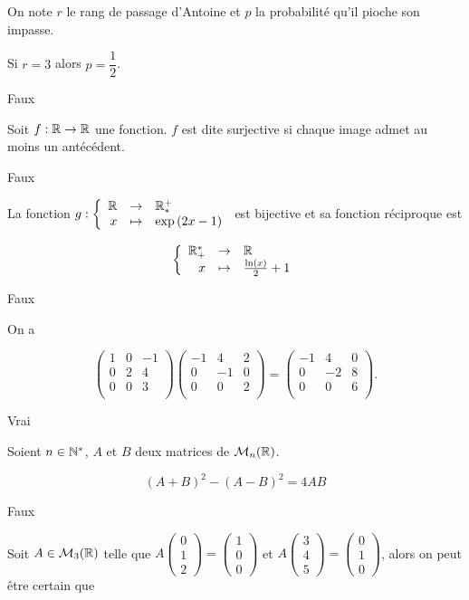 \documentclass{article}
\begin{document}
On note $r$ le rang de passage d'Antoine et $p$ la probabilité qu'il pioche son impasse.


Si $r=3$ alors $p = \dfrac{1}{2}$.

\reponse Faux

\question Soit $f : \mathbb{R} \to \mathbb{R}$ une fonction. $f$ est dite surjective si chaque image admet au moins un antécédent.  

\reponse Faux

\question La fonction $g : \left\{ \begin{array}{rcl}
\mathbb{R}  & \to & \mathbb{R}^+_* \\
x   & \mapsto & \exp\left( 2x-1 \right)
\end{array} \right.$ est bijective et sa fonction réciproque est 

$$ \left\{ \begin{array}{rcl}
\mathbb{R}^*_+  & \to & \mathbb{R} \\
x   & \mapsto &  \frac{\ln(x)}{2}  +1 
\end{array} \right.
$$


\reponse Faux

\question  On a 

$$
\left(\begin{array}{rrr}
1 & 0 & -1 \\
 0  & 2 & 4 \\
 0  & 0 & 3 \\
 \end{array} \right)
 \left(\begin{array}{rrr}
 -1 & 4 & 2 \\
 0  & -1 & 0 \\
 0  & 0 & 2 \\
 \end{array} \right) =
 \left(\begin{array}{rrr}
 -1 & 4 & 0 \\
 0  & -2 & 8 \\
 0  & 0 & 6 \\
 \end{array} \right).
$$

\reponse Vrai

\question Soient $n \in \mathbb{N}^*$, $A$ et $B$ deux matrices de $\mathcal{M}_{n}(\mathbb{R})$.

$$
(A+B)^2 - (A-B)^2 = 4AB
$$

\reponse Faux

\question Soit $A \in \mathcal{M}_{3}(\mathbb{R})$ telle que $A  \begin{pmatrix} 0 \\ 1 \\ 2 \end{pmatrix} = \begin{pmatrix} 1 \\ 0 \\ 0 \end{pmatrix}$ et  $A  \begin{pmatrix} 3 \\ 4 \\ 5 \end{pmatrix} = \begin{pmatrix} 0 \\ 1 \\ 0 \end{pmatrix}$, alors on peut être certain que 
\end{document}
